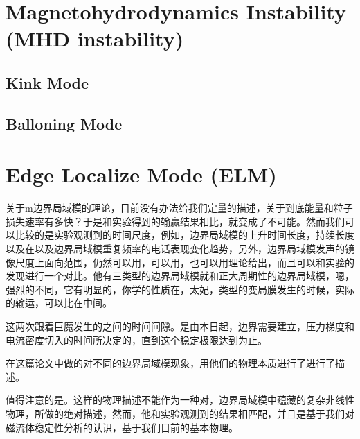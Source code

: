 \section{Magnetohydrodynamics Instability (MHD instability)}
\subsection{Kink Mode}
\subsection{Balloning Mode}

\section{Edge Localize Mode (ELM)}
关于m边界局域模的理论，目前没有办法给我们定量的描述，关于到底能量和粒子损失速率有多快？于是和实验得到的输赢结果相比，就变成了不可能。然而我们可以比较的是实验观测到的时间尺度，例如，边界局域模的上升时间长度，持续长度以及在以及边界局域模重复频率的电话表现变化趋势，另外，边界局域模发声的镜像尺度上面向范围，仍然可以用，可以用，也可以用理论给出，而且可以和实验的发现进行一个对比。他有三类型的边界局域模就和正大周期性的边界局域模，嗯，强烈的不同，它有明显的，你学的性质在，太妃，类型的变局膜发生的时候，实际的输运，可以比在中间。



这两次跟着巨魔发生的之间的时间间隙。是由本日起，边界需要建立，压力梯度和电流密度切入的时间所决定的，直到这个稳定极限达到为止。





在这篇论文中做的对不同的边界局域模现象，用他们的物理本质进行了进行了描述。


值得注意的是。这样的物理描述不能作为一种对，边界局域模中蕴藏的复杂非线性物理，所做的绝对描述，然而，他和实验观测到的结果相匹配，并且是基于我们对磁流体稳定性分析的认识，基于我们目前的基本物理。

